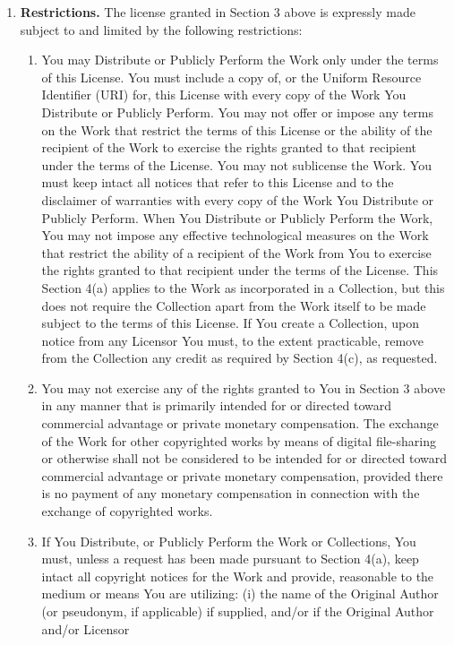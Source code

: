 \begin{enumerate}
  \item {\textbf{Restrictions.} The license granted in Section 3 above is
  expressly made subject to and limited by the following restrictions:}
  \begin{enumerate} 
    \item {You may Distribute or Publicly Perform the Work only under the terms
    of this License. You must include a copy of, or the Uniform Resource
    Identifier (URI) for, this License with every copy of the Work You
    Distribute or Publicly Perform. You may not offer or impose any terms on the
    Work that restrict the terms of this License or the ability of the recipient
    of the Work to exercise the rights granted to that recipient under the terms
    of the License. You may not sublicense the Work. You must keep intact all
    notices that refer to this License and to the disclaimer of warranties with
    every copy of the Work You Distribute or Publicly Perform. When You
    Distribute or Publicly Perform the Work, You may not impose any effective
    technological measures on the Work that restrict the ability of a recipient
    of the Work from You to exercise the rights granted to that recipient under
    the terms of the License. This Section 4(a) applies to the Work as
    incorporated in a Collection, but this does not require the Collection apart
    from the Work itself to be made subject to the terms of this License. If You
    create a Collection, upon notice from any Licensor You must, to the extent
    practicable, remove from the Collection any credit as required by Section
    4(c), as requested.}
    \item {You may not exercise any of the rights granted to You in Section 3
    above in any manner that is primarily intended for or directed toward
    commercial advantage or private monetary compensation. The exchange of the
    Work for other copyrighted works by means of digital file-sharing or
    otherwise shall not be considered to be intended for or directed toward
    commercial advantage or private monetary compensation, provided there is no
    payment of any monetary compensation in connection with the exchange of
    copyrighted works.}
    \item {If You Distribute, or Publicly Perform the Work or Collections, You
    must, unless a request has been made pursuant to Section 4(a), keep intact
    all copyright notices for the Work and provide, reasonable to the medium or
    means You are utilizing: (i) the name of the Original Author (or pseudonym,
    if applicable) if supplied, and/or if the Original Author and/or Licensor
}
\end{enumerate}
\end{enumerate}

